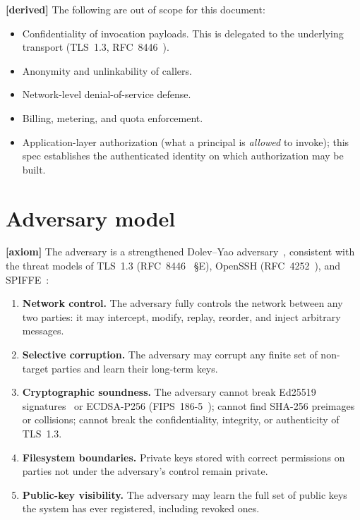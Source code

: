 \documentclass[11pt,a4paper]{article}
\newcommand{\axiom}{\textcolor{axiomcolor}{\textbf{[axiom]}}\xspace}
\newcommand{\derived}{\textcolor{derivedcolor}{\textbf{[derived]}}\xspace}
\begin{document}
\derived{} The following are out of scope for this document:

\begin{itemize}[leftmargin=2em,itemsep=0.2em]
    \item Confidentiality of invocation payloads. This is delegated to
    the underlying transport (TLS~1.3, RFC~8446~\cite{rfc8446}).
    \item Anonymity and unlinkability of callers.
    \item Network-level denial-of-service defense.
    \item Billing, metering, and quota enforcement.
    \item Application-layer authorization (what a principal is
    \emph{allowed} to invoke); this spec establishes the
    authenticated identity on which authorization may be built.
\end{itemize}

\section{Adversary model}
\label{sec:adversary}

\axiom{} The adversary is a strengthened Dolev--Yao
adversary~\cite{dolev1983security}, consistent with the threat models
of TLS~1.3 (RFC~8446~\cite{rfc8446} \S E), OpenSSH
(RFC~4252~\cite{rfc4252}), and SPIFFE~\cite{spiffe}:

\begin{enumerate}[leftmargin=2em,itemsep=0.2em]
    \item \textbf{Network control.} The adversary fully controls the
    network between any two parties: it may intercept, modify,
    replay, reorder, and inject arbitrary messages.
    \item \textbf{Selective corruption.} The adversary may corrupt any
    finite set of non-target parties and learn their long-term keys.
    \item \textbf{Cryptographic soundness.} The adversary cannot break
    Ed25519 signatures~\cite{bernstein2012high} or ECDSA-P256
    (FIPS~186-5~\cite{fips186-5}); cannot find SHA-256 preimages or
    collisions; cannot break the confidentiality, integrity, or
    authenticity of TLS~1.3.
    \item \textbf{Filesystem boundaries.} Private keys stored with
    correct permissions on parties not under the adversary's control
    remain private.
    \item \textbf{Public-key visibility.} The adversary may learn the
    full set of public keys the system has ever registered, including
    revoked ones.
\end{enumerate}
\end{document}

